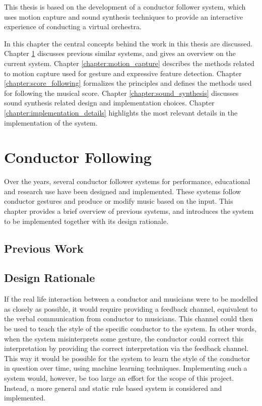 This thesis is based on the development of
a conductor follower system,
which uses motion capture and sound synthesis techniques
to provide an interactive experience of conducting a virtual orchestra.

In this chapter the central concepts behind
the work in this thesis are discussed.
Chapter \ref{chapter:conductor_following} discusses
previous similar systems, and gives an overview on the current system.
Chapter \ref{chapter:motion_capture} describes the
methods related to motion capture used for
gesture and expressive feature detection.
Chapter \ref{chapter:score_following}
formalizes the principles
and defines the methods used for following the musical score.
Chapter \ref{chapter:sound_synthesis}
discusses sound synthesis related design and
implementation choices.
Chapter \ref{chapter:implementation_details}
highlights the most relevant details
in the implementation of the system.

\chapter{Conductor Following}
\label{chapter:conductor_following}

Over the years, several conductor follower systems for
performance, educational and research use have been designed and implemented.
These systems follow conductor gestures
and produce or modify music based on the input.
This chapter provides a brief overview of previous systems,
and introduces the system to be implemented together with its design rationale.

\section{Previous Work}


\section{Design Rationale}

If the real life interaction between a conductor and musicians
were to be modelled as closely as possible,
it would require providing a feedback channel,
equivalent to the verbal communication from conductor to musicians.
This channel could then be used to teach the
style of the specific conductor to the system.
In other words, when the system misinterprets some gesture,
the conductor could correct this interpretation by 
providing the correct interpretation via the feedback channel.
This way it would be possible for the system to
learn the style of the conductor in question over time,
using machine learning techniques.
Implementing such a system would, however,
be too large an effort for the scope of this project.
Instead, a more general and static rule based system is
considered and implemented.

